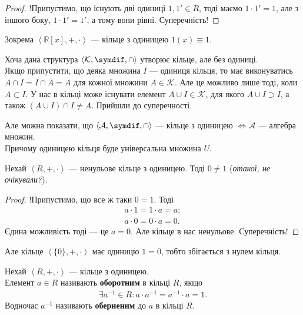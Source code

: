 \documentclass{math_library}
\begin{document}
\begin{proof}
!Припустимо, що існують дві одиниці $1, 1' \in R$, тоді маємо $1 \cdot 1' = 1$, але з іншого боку, $1 \cdot 1' = 1'$, а тому вони рівні. Суперечність!
\end{proof}

\begin{example}
Зокрема $\left<\mathbb{R}[x],+,\cdot \right>$ --- кільце з одиницею $1(x) \equiv 1$.
\end{example}

\begin{example}
Хоча дана структура $\left<\mathcal{K}, \symdif, \cap \right>$ утворює кільце, але без одиниці.
\bigskip \\
Якщо припустити, що деяка множина $I$ --- одиниця кільця, то має виконуватись $A \cap I = I \cap A = A$ для кожної множини $A \in \mathcal{K}$. Але це можливо лише тоді, коли $A \subset I$. У нас в кільці може існувати елемент $A \cup I \in \mathcal{K}$, для якого $A \cup I \supset I$, а також $(A \cup I) \cap I \neq A$. Прийшли до суперечності.
\end{example}

\begin{example}
Але можна показати, що $\left<\mathcal{A}, \symdif, \cap \right>$ --- кільце з одиницею $\iff \mathcal{A}$ --- алгебра множин. \\
Причому одиницею кільця буде універсальна множина $U$.
\end{example}

\begin{lemma}
Нехай $\left<R,+,\cdot \right>$ --- ненульове кільце з одиницею. Тоді $0 \neq 1$ (\textit{отакої, не очікували?}).
\end{lemma}

\begin{proof}
!Припустимо, що все ж таки $0 = 1$. Тоді
\begin{align*}
a \cdot 1 = 1 \cdot a = a; \\
a \cdot 0 = 0 \cdot a = 0.
\end{align*}
Єдина можливість тоді --- це $a = 0$. Але кільце в нас ненульове. Суперечність!
\end{proof}

\begin{remark}
Але кільце $\left< \{0\},+,\cdot \right>$ має одиницю $1 = 0$, тобто збігається з нулем кільця.
\end{remark}

\begin{definition}
Нехай $\left<R,+,\cdot \right>$ --- кільце з одиницею.\\
Елемент $a \in R$ називають \textbf{оборотним} в кільці $R$, якщо
\begin{align*}
\exists a^{-1} \in R: a \cdot a^{-1} = a^{-1} \cdot a = 1.
\end{align*}
Водночас $a^{-1}$ називають \textbf{оберненим} до $a$ в кільці $R$.
\end{definition}
\end{document}
